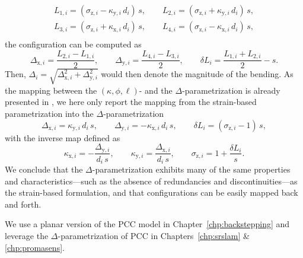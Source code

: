 \begin{equation}
\begin{split}
    L_{1,i} = \left ( \sigma_{\mathrm{z},i} - \kappa_{\mathrm{y},i} \, d_i \right ) \, s,
    \qquad
    L_{2,i} = \left ( \sigma_{\mathrm{z},i} + \kappa_{\mathrm{y},i} \, d_i \right ) \, s,\\
    L_{3,i} = \left ( \sigma_{\mathrm{z},i} + \kappa_{\mathrm{x},i} \, d_i \right ) \, s,
    \qquad
    L_{4,i} = \left ( \sigma_{\mathrm{z},i} - \kappa_{\mathrm{x},i} \, d_i \right ) \, s,\\
\end{split}
\end{equation}
the configuration can be computed as
\begin{equation}
    \Delta_{\mathrm{x},i} = \frac{L_{2,i} - L_{1,i}}{2},
    \qquad
    \Delta_{\mathrm{y},i} = \frac{L_{4,i} - L_{3,i}}{2},
    \qquad
    \delta L_i = \frac{L_{1,i} + L_{2,i}}{2} - s.
\end{equation}
Then, $\Delta_i = \sqrt{\Delta_{\mathrm{x},i}^2 + \Delta_{\mathrm{y},i}^2}$ would then denote the magnitude of the bending.
As the mapping between the $(\kappa,\phi,\ell)$- and the $\Delta$-parametrization is already presented in \citet{della2020improved}, we here only report the mapping from the strain-based parametrization into the $\Delta$-parametrization
\begin{equation}
    \Delta_{\mathrm{x},i} = \kappa_{\mathrm{y},i} \, d_i \, s,
    \qquad
    \Delta_{\mathrm{y},i} = -\kappa_{\mathrm{x},i} \, d_i \, s,
    \qquad
    \delta L_i = (\sigma_{\mathrm{z},i} - 1) \, s,
\end{equation}
with the inverse map defined as
\begin{equation}
    \kappa_{\mathrm{x},i} = - \frac{\Delta_{\mathrm{y},i}}{d_i \, s},
    \qquad
    \kappa_{\mathrm{y},i} =  \frac{\Delta_{\mathrm{x},i}}{d_i \, s},
    \qquad
    \sigma_{\mathrm{z},i} = 1 + \frac{\delta L_i}{s}.
\end{equation}
We conclude that the $\Delta$-parametrization exhibits many of the same properties and characteristics—such as the absence of redundancies and discontinuities—as the strain-based formulation, and that configurations can be easily mapped back and forth.

We use a planar version of the \gls{PCC} model in Chapter~\ref{chp:backstepping} and leverage the $\Delta$-parametrization of \gls{PCC} in Chapters~\ref{chp:srslam} \& \ref{chp:promasens}. 

